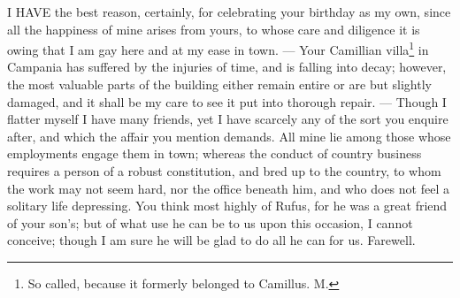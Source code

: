 I HAVE the best reason, certainly, for celebrating your birthday as my
own, since all the happiness of mine arises from yours, to whose care and
diligence it is owing that I am gay here and at my ease in town. —
Your Camillian villa\footnote{So called, because it
formerly belonged to Camillus. M.} in Campania has suffered by the injuries of
time, and is falling into decay; however, the most valuable parts of the
building either remain entire or are but slightly damaged, and it shall be
my care to see it put into thorough repair. — Though I flatter
myself I have many friends, yet I have scarcely any of the sort you
enquire after, and which the affair you mention demands. All mine lie
among those whose employments engage them in town; whereas the conduct of
country business requires a person of a robust constitution, and bred up
to the country, to whom the work may not seem hard, nor the office beneath
him, and who does not feel a solitary life depressing. You think most
highly of Rufus, for he was a great friend of your son's; but of what use
he can be to us upon this occasion, I cannot conceive; though I am sure he
will be glad to do all he can for us. Farewell.


